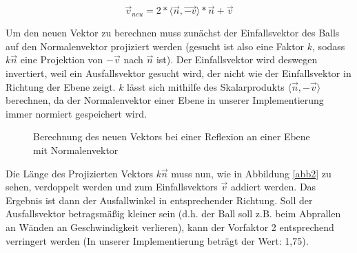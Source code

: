 \begin{equation}	
\label{reflexion}
	\vec{v}_{neu} = 2* \langle \vec{n},\vec{-v} \rangle * \vec{n} + \vec{v}
\end{equation}

Um den neuen Vektor zu berechnen muss zunächst der Einfallsvektor des Balls auf den Normalenvektor projiziert werden (gesucht ist also eine Faktor $k$, sodass $k\vec{n}$ eine Projektion von $-\vec{v}$ nach $\vec{n}$ ist). Der Einfallsvektor wird deswegen invertiert, weil ein Ausfallsvektor gesucht wird, der nicht wie der Einfallsvektor in Richtung der Ebene zeigt. $k$ lässt sich mithilfe des Skalarprodukts $\langle\vec{n},-\vec{v}\rangle$ berechnen, da der Normalenvektor einer Ebene in unserer Implementierung immer normiert gespeichert wird.



    \begin{figure}
	\begin{center}
    \hspace{1.5cm}%
    \caption{Berechnung des neuen Vektors bei einer Reflexion an einer Ebene mit Normalenvektor}
        \label{fig_reflexion}
	\end{center}
    \end{figure}
    
Die Länge des Projizierten Vektors $k\vec{n}$ muss nun, wie in Abbildung \ref{abb2} zu sehen, verdoppelt werden und zum Einfallsvektors $\vec{v}$ addiert werden. Das Ergebnis ist dann der Ausfallwinkel in entsprechender Richtung. Soll der Ausfallsvektor betragsmäßig kleiner sein (d.h. der Ball soll z.B. beim Abprallen an Wänden an Geschwindigkeit verlieren), kann der Vorfaktor 2 entsprechend verringert werden (In unserer Implementierung beträgt der Wert: 1,75).